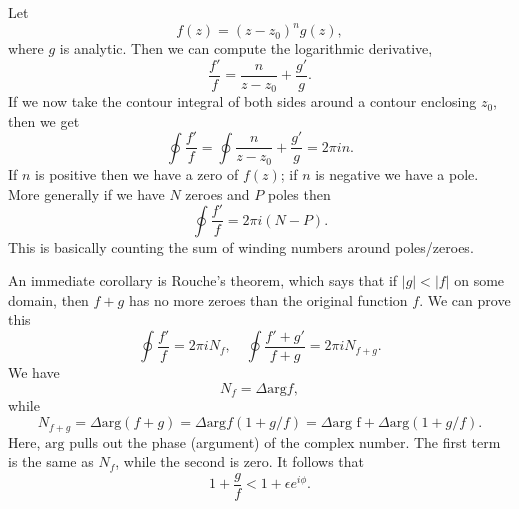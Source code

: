 Let
\begin{equation}
    f(z) = (z-z_0)^n g(z),
\end{equation}
where $g$ is analytic. Then we can compute the logarithmic derivative,
\begin{equation}
    \frac{f'}{f} = \frac{n}{z-z_0} + \frac{g'}{g}.
\end{equation}
If we now take the contour integral of both sides around a contour enclosing $z_0$, then we get
\begin{equation}
    \oint \frac{f'}{f} = \oint \frac{n}{z-z_0} + \frac{g'}{g} = 2\pi i n.
\end{equation}
If $n$ is positive then we have a zero of $f(z)$; if $n$ is negative we have a pole. More generally if we have $N$ zeroes and $P$ poles then
\begin{equation}
    \oint \frac{f'}{f} = 2\pi i (N-P).
\end{equation}
This is basically counting the sum of winding numbers around poles/zeroes.

An immediate corollary is Rouche's theorem, which says that if $|g|<|f|$ on some domain, then $f+g$ has no more zeroes than the original function $f$.
We can prove this
\begin{equation}
    \oint \frac{f'}{f} = 2\pi i N_f, \quad \oint \frac{f'+g'}{f+g} = 2\pi i N_{f+g}.
\end{equation}
We have
\begin{equation}
    N_f = \Delta \text{arg} f,
\end{equation}
while
\begin{equation}
    N_{f+g} = \Delta \text{arg}(f+g)= \Delta \text{arg}f(1+g/f) = \Delta \text{arg f} + \Delta \text{arg} (1+g/f).
\end{equation}
Here, $\text{arg}$ pulls out the phase (argument) of the complex number. The first term is the same as $N_f$, while the second is zero. It follows that
\begin{equation}
    1+\frac{g}{f} < 1 + \epsilon e^{i\phi}.
\end{equation}